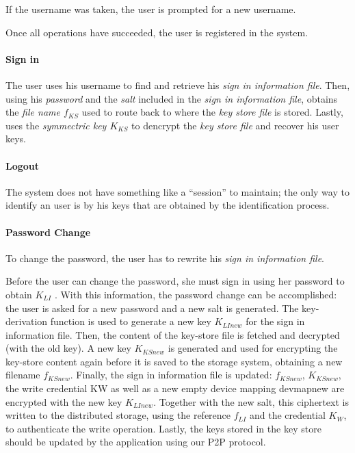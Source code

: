 \documentclass[12pt,spanish]{article}
\begin{document}
If the username was taken,
the user is prompted for a new username.

Once all operations
have succeeded, the user is registered in the system.



\paragraph{Sign in}
The user uses his username to find and retrieve his \textit{sign in information
file}. Then, using his \textit{password} and the \textit{salt} included in the
\textit{sign in information file}, obtains the \textit{file name $f_{KS}$} used to
route back to where the \textit{key store file} is stored.  Lastly, uses the
\textit{symmectric key $K_{KS}$} to dencrypt the \textit{key store file} and recover
his user keys.

\paragraph{Logout}
The system does not have something like a ``session'' to maintain; the only way
to identify an user is by his keys that are obtained by the identification
process.


\paragraph{Password Change}
To change the password, the user has to rewrite his \textit{sign in information
file}.

Before the user can change the password, she must sign in using her password to
obtain $K_{LI}$ . With this information, the password change can be accomplished:
the user is asked for a new password and a new salt is
generated. The key-derivation function is used to generate a new key
$K_{LInew}$
for the sign in information file. Then, the content of the key-store file is
fetched and decrypted (with the old key). A new key $K_{KSnew}$ is generated and
used for encrypting the key-store content again before it is saved to the
storage system, obtaining a new filename $f_{KSnew}$.
Finally, the sign in information file
is updated: $f_{KSnew}$, $K_{KSnew}$, the write credential KW as well as a new empty
device mapping devmapnew are encrypted with the new key $K_{LInew}$.
  Together with the new salt, this ciphertext is written to the distributed
storage, using the reference $f_{LI}$ and the credential $K_W$, to authenticate the
write operation. Lastly, the keys stored in the key store should be updated by
the application using our P2P protocol.
\end{document}
